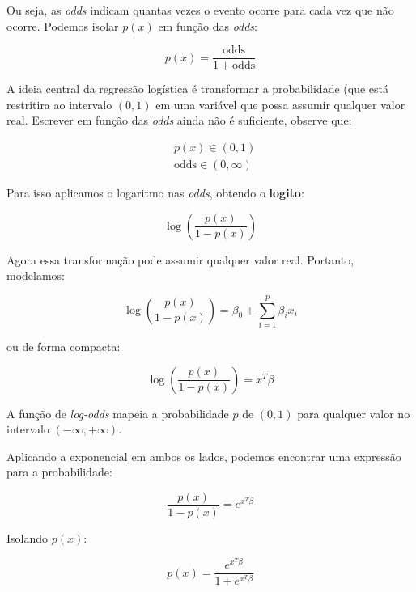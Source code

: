 \documentclass{article}
\begin{document}
Ou seja, as \textit{odds} indicam quantas vezes o evento ocorre para cada vez
que não ocorre. Podemos isolar $p(x)$ em função das \textit{odds}:

\begin{equation}
    p(x) = \frac{\text{odds}}{1 + \text{odds}}
\end{equation}

A ideia central da regressão logística é transformar a probabilidade (que está
restritira ao intervalo $(0, 1)$ em uma variável que possa assumir qualquer 
valor real. Escrever em função das \textit{odds} ainda não é suficiente, observe
que:

\begin{align*}
    &p(x) \in (0, 1) \\
    &\text{odds} \in (0, \infty)
\end{align*}

Para isso aplicamos o logaritmo nas \textit{odds}, obtendo o \textbf{logito}:

\begin{equation}
    \log\left(\frac{p(x)}{1 - p(x)}\right)
\end{equation}

Agora essa transformação pode assumir qualquer valor real. Portanto, modelamos:

\begin{equation}
    \log \left(\frac{p(x)}{1 - p(x)}\right) = \beta_0 + \sum_{i = 1}^{p}\beta_i x_i
\end{equation}

ou de forma compacta:

\begin{equation}
    \log \left(\frac{p(x)}{1 - p(x)}\right) = x^{T}\beta
\end{equation}

A função de \textit{log-odds} mapeia a probabilidade $p$ de $(0, 1)$ para qualquer 
valor no intervalo $(-\infty, +\infty)$.

Aplicando a exponencial em ambos os lados, podemos encontrar uma expressão para a 
probabilidade:

\begin{equation}
    \frac{p(x)}{1 - p(x)} = e^{x^{T}\beta}
\end{equation}

Isolando $p(x)$:

\begin{equation}
    p(x) = \frac{e^{x^{T}\beta}}{1 + e^{x^{T}\beta}}
\end{equation}
\end{document}
